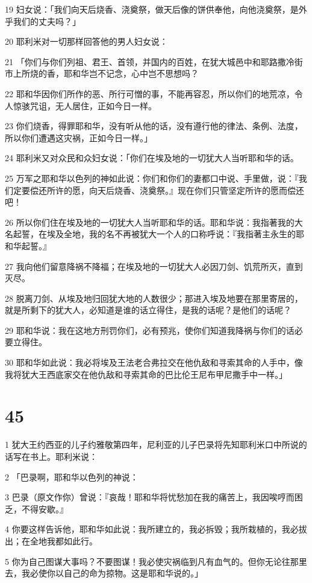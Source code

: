 \par 19 妇女说：「我们向天后烧香、浇奠祭，做天后像的饼供奉他，向他浇奠祭，是外乎我们的丈夫吗？」
\par 20 耶利米对一切那样回答他的男人妇女说：
\par 21 「你们与你们列祖、君王、首领，并国内的百姓，在犹大城邑中和耶路撒冷街市上所烧的香，耶和华岂不记念，心中岂不思想吗？
\par 22 耶和华因你们所作的恶、所行可憎的事，不能再容忍，所以你们的地荒凉，令人惊骇咒诅，无人居住，正如今日一样。
\par 23 你们烧香，得罪耶和华，没有听从他的话，没有遵行他的律法、条例、法度，所以你们遭遇这灾祸，正如今日一样。」
\par 24 耶利米又对众民和众妇女说：「你们在埃及地的一切犹大人当听耶和华的话。
\par 25 万军之耶和华以色列的神如此说：你们和你们的妻都口中说、手里做，说：『我们定要偿还所许的愿，向天后烧香、浇奠祭。』现在你们只管坚定所许的愿而偿还吧！
\par 26 所以你们住在埃及地的一切犹大人当听耶和华的话。耶和华说：我指著我的大名起誓，在埃及全地，我的名不再被犹大一个人的口称呼说：『我指著主永生的耶和华起誓。』
\par 27 我向他们留意降祸不降福；在埃及地的一切犹大人必因刀剑、饥荒所灭，直到灭尽。
\par 28 脱离刀剑、从埃及地归回犹大地的人数很少；那进入埃及地要在那里寄居的，就是所剩下的犹大人，必知道是谁的话立得住，是我的话呢？是他们的话呢？
\par 29 耶和华说：我在这地方刑罚你们，必有预兆，使你们知道我降祸与你们的话必要立得住。
\par 30 耶和华如此说：我必将埃及王法老合弗拉交在他仇敌和寻索其命的人手中，像我将犹大王西底家交在他仇敌和寻索其命的巴比伦王尼布甲尼撒手中一样。」

\chapter{45}

\par 1 犹大王约西亚的儿子约雅敬第四年，尼利亚的儿子巴录将先知耶利米口中所说的话写在书上。耶利米说：
\par 2 「巴录啊，耶和华以色列的神说：
\par 3 巴录（原文作你）曾说：『哀哉！耶和华将忧愁加在我的痛苦上，我因唉哼而困乏，不得安歇。』
\par 4 你要这样告诉他，耶和华如此说：我所建立的，我必拆毁；我所栽植的，我必拔出；在全地我都如此行。
\par 5 你为自己图谋大事吗？不要图谋！我必使灾祸临到凡有血气的。但你无论往那里去，我必使你以自己的命为掠物。这是耶和华说的。」


